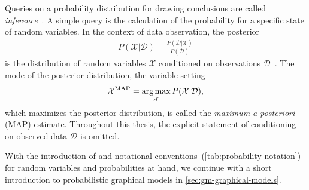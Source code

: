 Queries on a probability distribution for drawing conclusions are called
\emph{inference}~\citep[75]{barber_12_bayesian}. A simple query is the calculation of the
probability for a specific state of random variables. In the context of data observation, the
posterior
\begin{align}
    \label{eq:probability-posterior}
    P(\mathcal{X}|\mathcal{D}) = \frac{P(\mathcal{D}|\mathcal{X})}{P(\mathcal{D})}
\end{align}
is the distribution of random variables $\mathcal{X}$ conditioned on observations
$\mathcal{D}$~\citep[173]{barber_12_bayesian}. The mode of the posterior distribution, \ie the
variable setting
\begin{align}
    \mathcal{X}^{\text{MAP}} = \operatorname*{arg\,max}_{\mathcal{X}} P(\mathcal{X}|\mathcal{D}),
\end{align}
which maximizes the posterior distribution, is called the \emph{maximum a posteriori} (MAP)
estimate. Throughout this thesis, the explicit statement of conditioning on observed data
$\mathcal{D}$ is omitted.

With the introduction of and notational conventions~(\cref{tab:probability-notation}) for random
variables and probabilities at hand, we continue with a short introduction to probabilistic
graphical models in \cref{sec:gm-graphical-models}.










